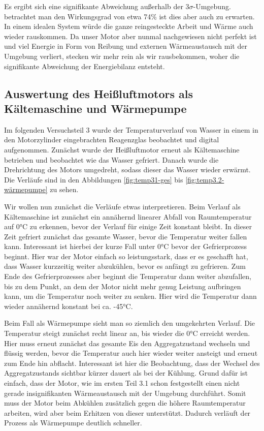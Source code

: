 \documentclass{article}
\begin{document}
Es ergibt sich eine signifikante Abweichung außerhalb der $3\sigma$-Umgebung. betrachtet man den Wirkungsgrad von etwa 74\% ist dies aber auch zu erwarten. In einem idealen System würde die ganze reingesteckte Arbeit und Wärme auch wieder rauskommen. Da unser Motor aber nunmal nachgewiesen nicht perfekt ist und viel Energie in Form von Reibung und externen Wärmeaustausch mit der Umgebung verliert, stecken wir mehr rein als wir rausbekommen, woher die signifikante Abweichung der Energiebilanz entsteht. 

\newpage
\subsection{Auswertung des Heißluftmotors als Kältemaschine und Wärmepumpe}

Im folgenden Versuchsteil 3 wurde der Temperaturverlauf von Wasser in einem in den Motorzylinder eingebrachten Reagenzglas beobachtet und digital aufgenommen. Zunächst wurde der Heißluftmotor erneut als Kältemaschine betrieben und beobachtet wie das Wasser gefriert. Danach wurde die Drehrichtung des Motors umgedreht, sodass dieser das Wasser wieder erwärmt. Die Verläufe sind in den Abbildungen \ref{fig:temp31-ges} bis \ref{fig:temp3.2-wärmepumpe} zu sehen. 

Wir wollen nun zunächst die Verläufe etwas interpretieren. Beim Verlauf als Kältemaschine ist zunächst ein annähernd linearer Abfall von Raumtemperatur auf 0°C zu erkennen, bevor der Verlauf für einige Zeit konstant bleibt. In dieser Zeit gefriert zunächst das gesamte Wasser, bevor die Temperatur weiter fallen kann. Interessant ist hierbei der kurze Fall unter 0°C bevor der Gefrierprozess beginnt. Hier war der Motor einfach so leistungsstark, dass er es geschafft hat, dass Wasser kurzzeitig weiter abzukühlen, bevor es anfängt zu gefrieren. Zum Ende des Gefrierprozesses aber beginnt die Temperatur dann weiter abzufallen, bis zu dem Punkt, an dem der Motor nicht mehr genug Leistung aufbringen kann, um die Temperatur noch weiter zu senken. Hier wird die Temperatur dann wieder annähernd konstant bei ca. -45°C.

Beim Fall als Wärmepumpe sieht man so ziemlich den umgekehrten Verlauf. Die Temperatur steigt zunächst recht linear an, bis wieder die 0°C erreicht werden. Hier muss erneut zunächst das gesamte Eis den Aggregatzustand wechseln und flüssig werden, bevor die Temperatur auch hier wieder weiter ansteigt und erneut zum Ende hin abflacht. Interessant ist hier die Beobachtung, dass der Wechsel des Aggregatzustands sichtbar kürzer dauert als bei der Kühlung. Grund dafür ist einfach, dass der Motor, wie im ersten Teil 3.1 schon festgestellt einen nicht gerade insignifikanten Wärmeaustausch mit der Umgebung durchführt. Somit muss der Motor beim Abkühlen zusätzlich gegen die höhere Raumtemperatur arbeiten, wird aber beim Erhitzen von dieser unterstützt. Dadurch verläuft der Prozess als Wärmepumpe deutlich schneller. 
\end{document}
